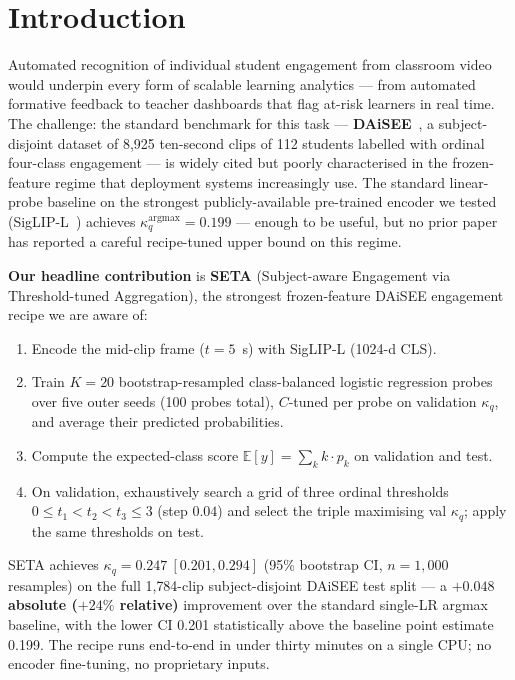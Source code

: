 \section{Introduction}
\label{sec:intro}

Automated recognition of individual student engagement from classroom
video would underpin every form of scalable learning analytics ---
from automated formative feedback to teacher dashboards that flag
at-risk learners in real time. The challenge: the standard benchmark
for this task --- \textbf{DAiSEE}~\cite{gupta2016daisee}, a
subject-disjoint dataset of 8{,}925 ten-second clips of 112 students
labelled with ordinal four-class engagement --- is widely cited but
poorly characterised in the frozen-feature regime that deployment
systems increasingly use. The standard linear-probe baseline on the
strongest publicly-available pre-trained encoder we tested
(SigLIP-L~\cite{zhai2023siglip}) achieves
$\kappa_q^{\text{argmax}} = 0.199$ --- enough to be useful, but no
prior paper has reported a careful recipe-tuned upper bound on this
regime.

\textbf{Our headline contribution} is \textbf{SETA} (Subject-aware
Engagement via Threshold-tuned Aggregation), the strongest
frozen-feature DAiSEE engagement recipe we are aware of:
\begin{enumerate}\itemsep0pt
  \item Encode the mid-clip frame ($t = 5$~s) with SigLIP-L
   (1024-d CLS).
  \item Train $K = 20$ bootstrap-resampled class-balanced logistic
   regression probes over five outer seeds (100 probes total),
   $C$-tuned per probe on validation $\kappa_q$, and average their
   predicted probabilities.
  \item Compute the expected-class score
   $\mathbb{E}[y] = \sum_{k} k \cdot p_k$ on validation and test.
  \item On validation, exhaustively search a grid of three ordinal
   thresholds $0 \le t_1 < t_2 < t_3 \le 3$ (step $0.04$) and select
   the triple maximising val $\kappa_q$; apply the same thresholds
   on test.
\end{enumerate}

SETA achieves \textbf{$\kappa_q = 0.247~[0.201, 0.294]$} (95\%
bootstrap CI, $n = 1{,}000$ resamples) on the full 1{,}784-clip
subject-disjoint DAiSEE test split --- a \textbf{$+0.048$ absolute
($+24\%$ relative)} improvement over the standard single-LR argmax
baseline, with the lower CI 0.201 statistically above the baseline
point estimate 0.199. The recipe runs end-to-end in under thirty
minutes on a single CPU; no encoder fine-tuning, no proprietary
inputs.

